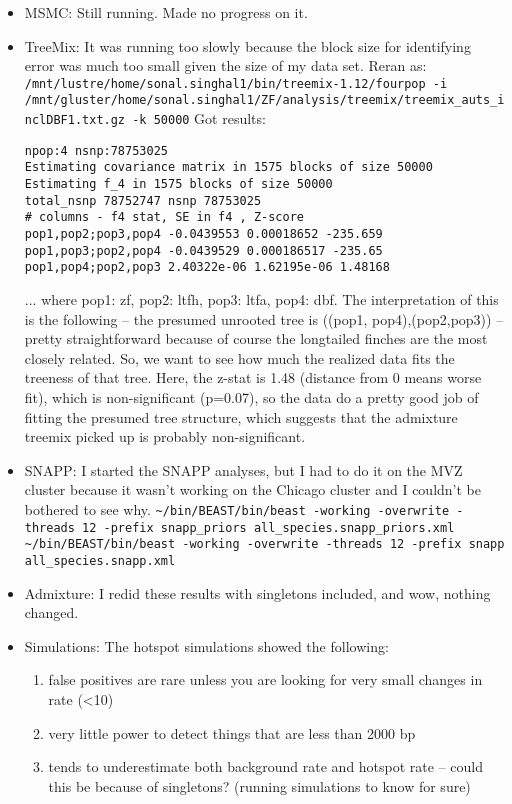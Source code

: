 \documentclass[idxtotoc,hyperref,openany,oneside]{labbook} %
\begin{document}
\begin{itemize}
\item MSMC: Still running. Made no progress on it.
\item TreeMix: It was running too slowly because the block size for identifying error was much too small given the size of my data set. Reran as: \verb+/mnt/lustre/home/sonal.singhal1/bin/treemix-1.12/fourpop -i /mnt/gluster/home/sonal.singhal1/ZF/analysis/treemix/treemix_auts_inclDBF1.txt.gz -k 50000+
Got results:
\begin{verbatim}
npop:4 nsnp:78753025
Estimating covariance matrix in 1575 blocks of size 50000
Estimating f_4 in 1575 blocks of size 50000
total_nsnp 78752747 nsnp 78753025
# columns - f4 stat, SE in f4 , Z-score
pop1,pop2;pop3,pop4 -0.0439553 0.00018652 -235.659
pop1,pop3;pop2,pop4 -0.0439529 0.000186517 -235.65
pop1,pop4;pop2,pop3 2.40322e-06 1.62195e-06 1.48168
\end{verbatim}
... where pop1: zf, pop2: ltfh, pop3: ltfa, pop4: dbf. The interpretation of this is the following -- the presumed unrooted tree is ((pop1, pop4),(pop2,pop3)) -- pretty straightforward because of course the longtailed finches are the most closely related. So, we want to see how much the realized data fits the treeness of that tree. Here, the z-stat is 1.48 (distance from 0 means worse fit), which is non-significant (p=0.07), so the data do a pretty good job of fitting the presumed tree structure, which suggests that the admixture treemix picked up is probably non-significant.
\item SNAPP: I started the SNAPP analyses, but I had to do it on the MVZ cluster because it wasn't working on the Chicago cluster and I couldn't be bothered to see why.
\verb+~/bin/BEAST/bin/beast -working -overwrite -threads 12 -prefix snapp_priors all_species.snapp_priors.xml+
\verb+~/bin/BEAST/bin/beast -working -overwrite -threads 12 -prefix snapp all_species.snapp.xml+
\item Admixture: I redid these results with singletons included, and wow, nothing changed.
\item Simulations: The hotspot simulations showed the following:
\begin{enumerate}
\item false positives are rare unless you are looking for very small changes in rate (<10)
\item very little power to detect things that are less than 2000 bp
\item tends to underestimate both background rate and hotspot rate -- could this be because of singletons? (running simulations to know for sure)

\end{enumerate}
\end{itemize}
\end{document}
